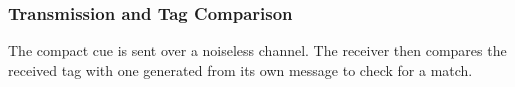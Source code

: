 \documentclass[%
  english,%
  paper=A1,%
  fontsize=22pt,%
  cdfoot=5ex,%
  ddcfoot,%
  BCOR=-20mm,
]{tudscrposter}
\begin{document}
\begin{multicols}{5}
\begin{tcolorbox}[colback=tagcomparison!30, colframe=tagcomparison, boxrule=0pt, left=0pt, right=0pt, top=2pt, bottom=2pt, width=\linewidth]
\subsubsection*{Transmission and Tag Comparison}
\end{tcolorbox}
The compact cue is sent over a noiseless channel. The receiver then compares the received tag with one generated from its own message to check for a match.
\end{multicols}


\vspace{2em}
\end{document}
